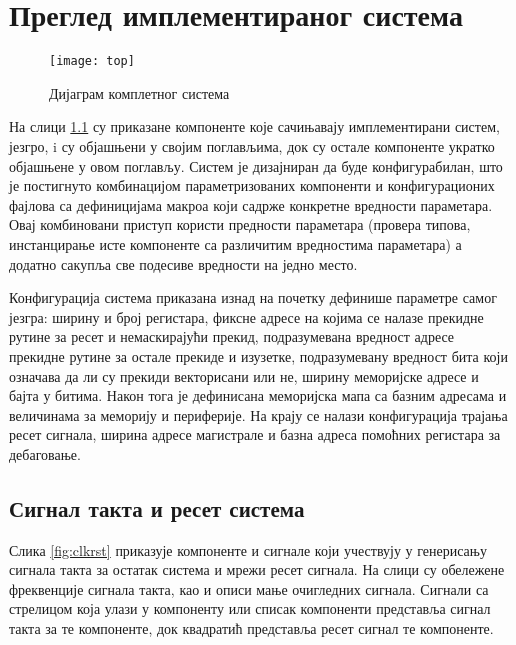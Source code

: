 \chapter{Преглед имплементираног система}

\begin{figure}[h!]
	\centering
	\texttt{[image: top]}
	\caption{Дијаграм комплетног система}
	\label{fig:top}
\end{figure}\newpage

На слици \ref{fig:top} су приказане компоненте које сачињавају имплементирани систем,  језгро,  i  су објашњени у својим поглављима, док су остале компоненте укратко објашњене у овом поглављу. Систем је дизајниран да буде конфигурабилан, што је постигнуто комбинацијом параметризованих компоненти и конфигурационих фајлова са дефиницијама макроа који садрже конкретне вредности параметара. Овај комбиновани приступ користи предности параметара (провера типова, инстанцирање исте компоненте са различитим вредностима параметара) а додатно сакупља све подесиве вредности на једно место. 



Конфигурација система приказана изнад на почетку дефинише параметре самог језгра: ширину и број регистара, фиксне адресе на којима се налазе прекидне рутине за ресет и немаскирајући прекид, подразумевана вредност адресе прекидне рутине за остале прекиде и изузетке, подразумевану вредност бита који означава да ли су прекиди векторисани или не, ширину меморијске адресе и бајта у битима. Након тога је дефинисана меморијска мапа са базним адресама и величинама за меморију и периферије. На крају се налази конфигурација трајања ресет сигнала, ширина адресе  магистрале и базна адреса помоћних регистара за дебаговање.

\section{Сигнал такта и ресет система}

Слика \ref{fig:clkrst} приказује компоненте и сигнале који учествују у генерисању сигнала такта за остатак система и мрежи ресет сигнала. На слици су обележене фреквенције сигнала такта, као и описи мање очигледних сигнала. Сигнали са стрелицом која улази у компоненту или списак компоненти представља сигнал такта за те компоненте, док квадратић представља ресет сигнал те компоненте. 

